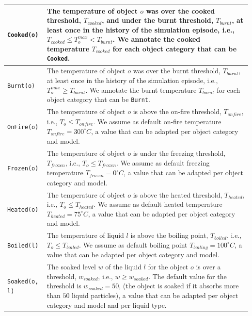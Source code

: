 \begin{table}[!htbp]
\begin{center}
{\begin{tabular}{ | m{} | m{} | }
\hline
\texttt{Cooked(o)} & The temperature of object $o$ was over the cooked threshold, $T_\mathit{cooked}$, and under the burnt threshold, $T_\mathit{burnt}$, at least once in the history of the simulation episode, i.e., $T_\mathit{cooked} \leq T_o^\mathit{max} < T_\mathit{burnt}$. We annotate the cooked temperature $T_\mathit{cooked}$ for each object category that can be \texttt{Cooked}.\\
\hline
\texttt{Burnt(o)} & The temperature of object $o$ was over the burnt threshold, $T_\mathit{burnt}$, at least once in the history of the simulation episode, i.e., $T_o^\mathit{max} \geq T_\mathit{burnt}$. We annotate the burnt temperature $T_\mathit{burnt}$ for each object category that can be \texttt{Burnt}.\\
\hline
\texttt{OnFire(o)} & The temperature of object $o$ is above the on-fire threshold, $T_\mathit{onfire}$, i.e., $T_o \leq T_\mathit{onfire}$. We assume as default on-fire temperature $T_\mathit{onfire}=300^\circ C$, a value that can be adapted per object category and model.\\
\hline
\texttt{Frozen(o)} & The temperature of object $o$ is under the freezing threshold, $T_\mathit{frozen}$, i.e., $T_o \leq T_\mathit{frozen}$. We assume as default freezing temperature $T_\mathit{frozen}=0^\circ C$, a value that can be adapted per object category and model.\\
\hline
\texttt{Heated(o)} & The temperature of object $o$ is above the heated threshold, $T_\mathit{heated}$, i.e., $T_o \leq T_\mathit{heated}$. We assume as default heated temperature $T_\mathit{heated}=75^\circ C$, a value that can be adapted per object category and model.\\
\hline
\texttt{Boiled(l)} & The temperature of liquid $l$ is above the boiling point, $T_\mathit{boiled}$, i.e., $T_o \leq T_\mathit{boiled}$. We assume as default boiling point $T_\mathit{boiling}=100^\circ C$, a value that can be adapted per object category and model.\\
\hline
\texttt{Soaked(o, l)} & The soaked level $w$ of the liquid $l$ for the object $o$ is over a threshold, $w_\mathit{soaked}$, i.e., $w \geq w_\mathit{soaked}$. The default value for the threshold is $w_\mathit{soaked}=50$, (the object is soaked if it absorbs more than $50$ liquid particles), a value that can be adapted per object category and model and per liquid type.\\
\hline


\end{tabular}}
\end{center}
\end{table}
